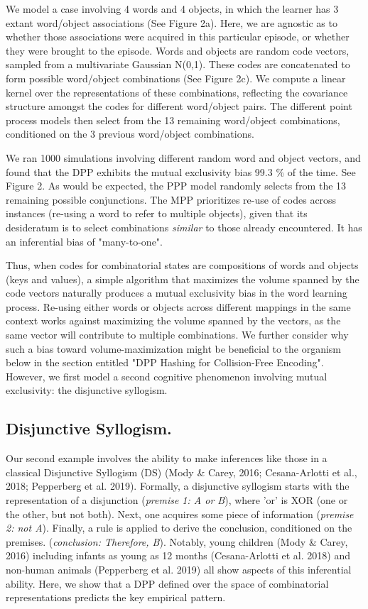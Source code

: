 \documentclass[10pt,letterpaper]{article}
\begin{document}
We model a case involving 4 words and 4 objects, in which the learner has 3 extant word/object associations (See Figure 2a). Here, we are agnostic as to whether those associations were acquired in this particular episode, or whether they were brought to the episode. Words and objects are random code vectors, sampled from a multivariate Gaussian N(0,1). These codes are concatenated to form possible word/object combinations (See Figure 2c). We compute a linear kernel over the representations of these combinations, reflecting the covariance structure amongst the codes for different word/object pairs. The different point process models then select from the 13 remaining word/object combinations, conditioned on the 3 previous word/object combinations.



We ran 1000 simulations involving different random word and object vectors, and found that the DPP exhibits the mutual exclusivity bias 99.3 \% of the time. See Figure 2. As would be expected, the PPP model randomly selects from the 13 remaining possible conjunctions. The MPP prioritizes re-use of codes across instances (re-using a word to refer to multiple objects), given that its desideratum is to select combinations \textit{similar} to those already encountered. It has an inferential bias of "many-to-one".

Thus, when codes for combinatorial states are compositions of words and objects (keys and values), a simple algorithm that maximizes the volume spanned by the code vectors naturally produces a mutual exclusivity bias in the word learning process. Re-using either words or objects across different mappings in the same context works against maximizing the volume spanned by the vectors, as the same vector will contribute to multiple combinations. We further consider why such a bias toward volume-maximization might be beneficial to the organism below in the section entitled "DPP Hashing for Collision-Free Encoding". However, we first model a second cognitive phenomenon involving mutual exclusivity: the disjunctive syllogism.

\subsection{Disjunctive Syllogism.}

Our second example involves the ability to make inferences like those in a classical Disjunctive Syllogism (DS) (Mody \& Carey, 2016; Cesana-Arlotti et al., 2018; Pepperberg et al. 2019). Formally, a disjunctive syllogism starts with the representation of a disjunction (\textit{premise 1: A or B}), where 'or' is XOR (one or the other, but not both). Next, one acquires some piece of information (\textit{premise 2: not A}). Finally, a rule is applied to derive the conclusion, conditioned on the premises. (\textit{conclusion: Therefore, B}). Notably, young children (Mody \& Carey, 2016) including infants as young as 12 months (Cesana-Arlotti et al. 2018) and non-human animals (Pepperberg et al. 2019) all show aspects of this inferential ability. Here, we show that a DPP defined over the space of combinatorial representations predicts the key empirical pattern. 
\end{document}

